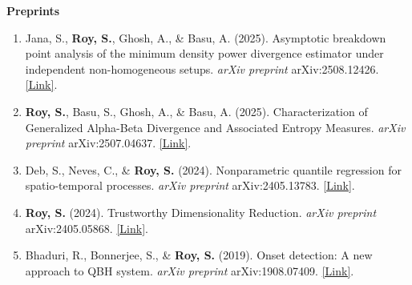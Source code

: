 \documentclass[10pt]{developercv} %
\begin{document}
\textbf{Preprints}
\begin{enumerate}
    \item Jana, S., \textbf{Roy, S.}, Ghosh, A., \& Basu, A. (2025). Asymptotic breakdown point analysis of the minimum density power divergence estimator under independent non-homogeneous setups. \emph{arXiv preprint} arXiv:2508.12426. \href{https://arxiv.org/abs/2508.12426}{[Link]}.
    \item \textbf{Roy, S.}, Basu, S., Ghosh, A., \& Basu, A. (2025). Characterization of Generalized Alpha-Beta Divergence and Associated Entropy Measures. \emph{arXiv preprint} arXiv:2507.04637. \href{https://arxiv.org/abs/2507.04637}{[Link]}.
    \item Deb, S., Neves, C., \& \textbf{Roy, S.} (2024). Nonparametric quantile regression for spatio-temporal processes. \emph{arXiv preprint} arXiv:2405.13783. \href{https://arxiv.org/abs/2405.13783}{[Link]}.
    \item \textbf{Roy, S.} (2024). Trustworthy Dimensionality Reduction. \emph{arXiv preprint} arXiv:2405.05868. \href{https://arxiv.org/abs/2405.05868}{[Link]}.
    \item Bhaduri, R., Bonnerjee, S., \& \textbf{Roy, S.} (2019). Onset detection: A new approach to QBH system. \emph{arXiv preprint} arXiv:1908.07409. \href{https://arxiv.org/abs/1908.07409}{[Link]}.
\end{enumerate}



\vspace*{-10pt}
\end{document}
